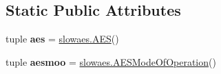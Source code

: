 \subsection*{Static Public Attributes}
\begin{DoxyCompactItemize}
\item 
\hypertarget{classsimplegui3_1_1_main_scene_a78e2027ae1ef8d98bfa58dd6737373a2}{tuple {\bfseries aes} = \hyperlink{classslowaes_1_1_a_e_s}{slowaes.\-A\-E\-S}()}\label{classsimplegui3_1_1_main_scene_a78e2027ae1ef8d98bfa58dd6737373a2}

\item 
\hypertarget{classsimplegui3_1_1_main_scene_a980ca4a42256d9f2551b999521a54ab5}{tuple {\bfseries aesmoo} = \hyperlink{classslowaes_1_1_a_e_s_mode_of_operation}{slowaes.\-A\-E\-S\-Mode\-Of\-Operation}()}\label{classsimplegui3_1_1_main_scene_a980ca4a42256d9f2551b999521a54ab5}

\end{DoxyCompactItemize}


